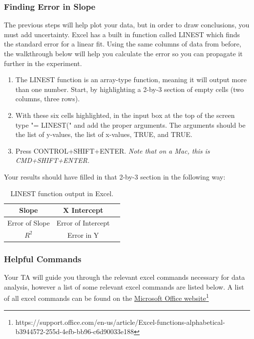 \subsubsection{Finding Error in Slope}

The previous steps will help plot your data, but in order to draw conclusions, you must add uncertainty. Excel has a built in function called LINEST which finds the standard error for a linear fit. Using the same columns of data from before, the walkthrough below will help you calculate the error so you can propagate it further in the experiment.

\begin{enumerate}
\item The LINEST function is an array-type function, meaning it will output more than one number. Start, by highlighting a 2-by-3 section of empty cells (two columns, three rows).
\item With these six cells highlighted, in the input box at the top of the screen type "= LINEST(" and add the proper arguments. The arguments should be the list of y-values, the list of x-values, TRUE, and TRUE.
\item Press CONTROL+SHIFT+ENTER. \it{Note that on a Mac, this is CMD+SHIFT+ENTER.}
\end{enumerate}

Your results should have filled in that 2-by-3 section in the following way:
\begin {table}[H]
\begin{center}
\begin{tabular}{ |c | c | c |}
\hline
Slope &X Intercept \\ \hline
Error of Slope &Error of Intercept \\ \hline
$R^2$ &Error in Y \\ \hline
\end{tabular}
\caption{LINEST function output in Excel.}
\end{center}
\end{table}

\subsubsection{Helpful Commands}

Your TA will guide you through the relevant excel commands necessary for data analysis, however a list of some relevant excel commands are listed below. A list of all excel commands can be found on the \href{https://support.office.com/en-us/article/Excel-functions-alphabetical-b3944572-255d-4efb-bb96-c6d90033e188}{Microsoft Office website}\footnote{https://support.office.com/en-us/article/Excel-functions-alphabetical-b3944572-255d-4efb-bb96-c6d90033e188}

